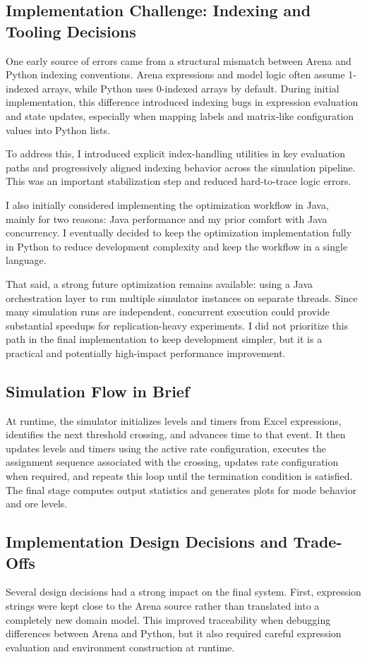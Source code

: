 \documentclass[11pt]{article}
\begin{document}
\subsection{Implementation Challenge: Indexing and Tooling Decisions}
One early source of errors came from a structural mismatch between Arena and Python indexing conventions. Arena expressions and model logic often assume 1-indexed arrays, while Python uses 0-indexed arrays by default. During initial implementation, this difference introduced indexing bugs in expression evaluation and state updates, especially when mapping labels and matrix-like configuration values into Python lists.

To address this, I introduced explicit index-handling utilities in key evaluation paths and progressively aligned indexing behavior across the simulation pipeline. This was an important stabilization step and reduced hard-to-trace logic errors.

I also initially considered implementing the optimization workflow in Java, mainly for two reasons: Java performance and my prior comfort with Java concurrency. I eventually decided to keep the optimization implementation fully in Python to reduce development complexity and keep the workflow in a single language.

That said, a strong future optimization remains available: using a Java orchestration layer to run multiple simulator instances on separate threads. Since many simulation runs are independent, concurrent execution could provide substantial speedups for replication-heavy experiments. I did not prioritize this path in the final implementation to keep development simpler, but it is a practical and potentially high-impact performance improvement.

\subsection{Simulation Flow in Brief}
At runtime, the simulator initializes levels and timers from Excel expressions, identifies the next threshold crossing, and advances time to that event. It then updates levels and timers using the active rate configuration, executes the assignment sequence associated with the crossing, updates rate configuration when required, and repeats this loop until the termination condition is satisfied. The final stage computes output statistics and generates plots for mode behavior and ore levels.

\subsection{Implementation Design Decisions and Trade-Offs}
Several design decisions had a strong impact on the final system. First, expression strings were kept close to the Arena source rather than translated into a completely new domain model. This improved traceability when debugging differences between Arena and Python, but it also required careful expression evaluation and environment construction at runtime.
\end{document}
